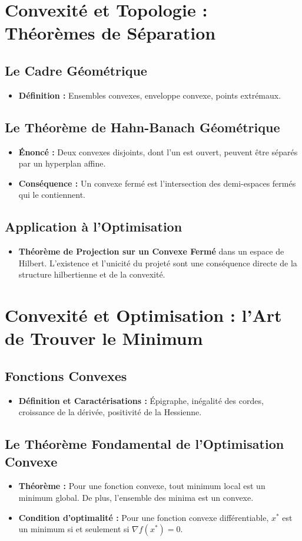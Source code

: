 \documentclass[12pt, a4paper, parskip=full]{report}
\theoremstyle{agregstyle}
\begin{document}
\section{Convexité et Topologie : Théorèmes de Séparation}
\subsection{Le Cadre Géométrique}
\begin{itemize}
    \item \textbf{Définition :} Ensembles convexes, enveloppe convexe, points extrémaux.
\end{itemize}
\subsection{Le Théorème de Hahn-Banach Géométrique}
\begin{itemize}
    \item \textbf{Énoncé :} Deux convexes disjoints, dont l'un est ouvert, peuvent être séparés par un hyperplan affine.
    \item \textbf{Conséquence :} Un convexe fermé est l'intersection des demi-espaces fermés qui le contiennent.
\end{itemize}
\subsection{Application à l'Optimisation}
\begin{itemize}
    \item \textbf{Théorème de Projection sur un Convexe Fermé} dans un espace de Hilbert. L'existence et l'unicité du projeté sont une conséquence directe de la structure hilbertienne et de la convexité.
\end{itemize}

\section{Convexité et Optimisation : l'Art de Trouver le Minimum}
\subsection{Fonctions Convexes}
\begin{itemize}
    \item \textbf{Définition et Caractérisations :} Épigraphe, inégalité des cordes, croissance de la dérivée, positivité de la Hessienne.
\end{itemize}
\subsection{Le Théorème Fondamental de l'Optimisation Convexe}
\begin{itemize}
    \item \textbf{Théorème :} Pour une fonction convexe, tout minimum local est un minimum global. De plus, l'ensemble des minima est un convexe.
    \item \textbf{Condition d'optimalité :} Pour une fonction convexe différentiable, $x^*$ est un minimum si et seulement si $\nabla f(x^*) = 0$.
\end{itemize}
\end{document}
